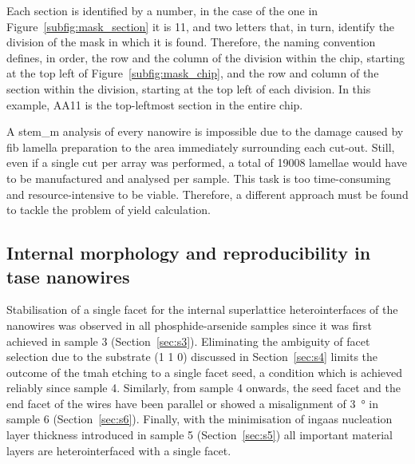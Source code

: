Each section is identified by a number, in the case of the one in Figure~\ref{subfig:mask_section} it is \num{11}, and two letters that, in turn, identify the division of the mask in which it is found. Therefore, the naming convention defines, in order, the row and the column of the division within the chip, starting at the top left of Figure~\ref{subfig:mask_chip}, and the row and column of the section within the division, starting at the top left of each division. In this example, AA11 is the top-leftmost section in the entire chip.

A \acf{stem_m} analysis of every nanowire is impossible due to the damage caused by \acf{fib} lamella preparation to the area immediately surrounding each cut-out. Still, even if a single cut per array was performed, a total of \num{19008} lamellae would have to be manufactured and analysed per sample. This task is too time-consuming and resource-intensive to be viable. Therefore, a different approach must be found to tackle the problem of yield calculation.

\subsection{\texorpdfstring{Internal morphology and reproducibility in \acs{tase} nanowires}{Internal morphology and reproducibility in TASE nanowires}}

Stabilisation of a single  facet for the internal superlattice heterointerfaces of the nanowires was observed in all phosphide-arsenide samples since it was first achieved in sample 3 (Section~\ref{sec:s3}). Eliminating the ambiguity of facet selection due to the substrate \hkl(1 1 0) discussed in Section~\ref{sec:s4} limits the outcome of the \acf{tmah} etching to a single facet seed, a condition which is achieved reliably since sample 4. Similarly, from sample 4 onwards, the seed facet and the end facet of the wires have been parallel or showed a misalignment of \qty{3}{\degree} in sample 6 (Section~\ref{sec:s6}). Finally, with the minimisation of \acf{ingaas} nucleation layer thickness introduced in sample 5 (Section~\ref{sec:s5}) all important material layers are heterointerfaced with a single  facet.

